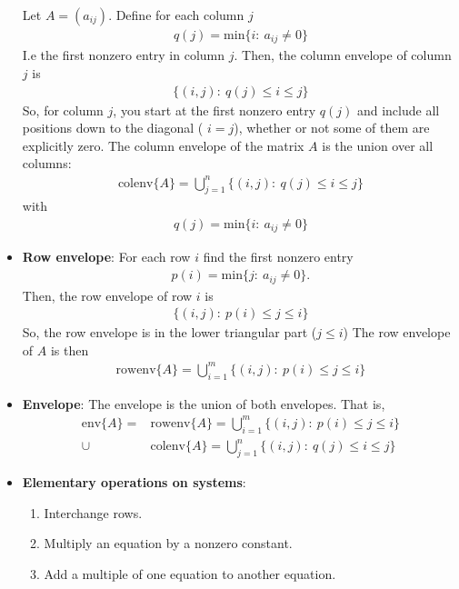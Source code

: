 \documentclass{report}
\begin{document}
\begin{itemize}
        \bigbreak \noindent 
        Let $A  = (a_{ij})$. Define for each column $j$
        \begin{align*}
            q(j) = \text{min}\{i:\ a_{ij} \ne 0\}
        \end{align*}
        I.e the first nonzero entry in column $j$. Then, the column envelope of column $j$ is 
        \begin{align*}
            \{(i,j):\ q(j) \leq i \leq j\}
        \end{align*}
        So, for column $j$, you start at the first nonzero entry $q(j)$ and include all positions down to the diagonal ( $i=j$), whether or not some of them are explicitly zero.
        \bigbreak \noindent 
        The column envelope of the matrix $A$ is the union over all columns:
        \begin{align*}
            \text{colenv}\{A\} = \bigcup_{j=1}^{n}\{(i,j):\ q(j) \leq i \leq j\}
        \end{align*}
        with 
        \begin{align*}
            q(j) = \text{min}\{i:\ a_{ij} \ne 0\}
        \end{align*}
    \item \textbf{Row envelope}: For each row $i$ find the first nonzero entry
        \begin{align*}
            p(i) = \text{min}\{j:\ a_{ij} \ne 0\}.
        \end{align*}
        Then, the row envelope of row $i$ is 
        \begin{align*}
            \{(i,j):\ p(i) \leq j \leq i\}
        \end{align*}
        So, the row envelope is in the lower triangular part ($j \leq i $)
        \bigbreak \noindent 
        The row envelope of $A$ is then
        \begin{align*}
            \text{rowenv}\{A\} = \bigcup_{i=1}^{m}\{(i,j):\ p(i) \leq j \leq i\}
        \end{align*}
    \item \textbf{Envelope}: The envelope is the union of both envelopes. That is,
        \begin{align*}
            \text{env}\{A\} = &\text{rowenv}\{A\} = \bigcup_{i=1}^{m}\{(i,j):\ p(i) \leq j \leq i\}  \\
            \cup &\text{colenv}\{A\} = \bigcup_{j=1}^{n}\{(i,j):\ q(j) \leq i \leq j\}
        \end{align*}
    \item \textbf{Elementary operations on systems}:
        \begin{enumerate}
            \item Interchange rows.
            \item Multiply an equation by a nonzero constant.
            \item Add a multiple of one equation to another equation.
        \end{enumerate}


\end{itemize}
\end{document}
